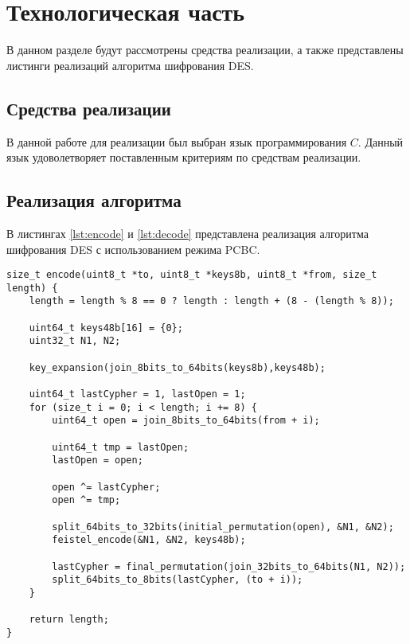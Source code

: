 \chapter{Технологическая часть}

В данном разделе будут рассмотрены средства реализации, а также представлены листинги реализаций алгоритма шифрования DES.

\section{Средства реализации}
В данной работе для реализации был выбран язык программирования $C$. Данный язык удоволетворяет поставленным критериям по средствам реализации.

\section{Реализация алгоритма}

В листингах \ref{lst:encode} и \ref{lst:decode} представлена реализация алгоритма шифрования DES с использованием режима PCBC.

\begin{center}
    \captionsetup{justification=raggedright,singlelinecheck=off}
    \begin{lstlisting}[label=lst:encode,caption=Шифрование DES]
size_t encode(uint8_t *to, uint8_t *keys8b, uint8_t *from, size_t length) {
	length = length % 8 == 0 ? length : length + (8 - (length % 8));
	
	uint64_t keys48b[16] = {0};
	uint32_t N1, N2;
	
	key_expansion(join_8bits_to_64bits(keys8b),keys48b);
	
	uint64_t lastCypher = 1, lastOpen = 1;
	for (size_t i = 0; i < length; i += 8) {
		uint64_t open = join_8bits_to_64bits(from + i);
		
		uint64_t tmp = lastOpen;
		lastOpen = open;
		
		open ^= lastCypher;
		open ^= tmp;
		
		split_64bits_to_32bits(initial_permutation(open), &N1, &N2);
		feistel_encode(&N1, &N2, keys48b);
		
		lastCypher = final_permutation(join_32bits_to_64bits(N1, N2));
		split_64bits_to_8bits(lastCypher, (to + i));
	}
	
	return length;
}
\end{lstlisting}
\end{center}

